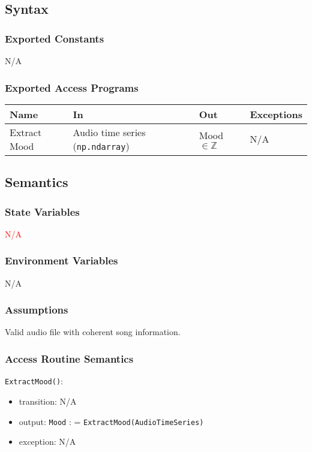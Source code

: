 \documentclass[12pt, titlepage]{article}
\begin{document}
\subsection{Syntax}

\subsubsection{Exported Constants}
N/A

\subsubsection{Exported Access Programs}

\begin{center}
\begin{tabular}{p{2cm} p{4cm} p{4cm} p{2cm}}
\hline
\textbf{Name} & \textbf{In} & \textbf{Out} & \textbf{Exceptions}\\
\hline%
Extract Mood &Audio time series (\texttt{np.ndarray}) &Mood $\in{\mathbb{Z}}$ &N/A\\
\hline
\end{tabular}
\end{center}

\subsection{Semantics}

\subsubsection{State Variables}
\textcolor{red}{N/A}

\subsubsection{Environment Variables}
N/A

\subsubsection{Assumptions}
Valid audio file with coherent song information.

\subsubsection{Access Routine Semantics}

\noindent \texttt{Extract\textunderscore Mood()}:
\begin{itemize}
\item transition: N/A 
\item output: \texttt{Mood} : = \texttt{Extract\textunderscore Mood(Audio\textunderscore Time\textunderscore Series)}
\item exception: N/A
\end{itemize}
\end{document}
